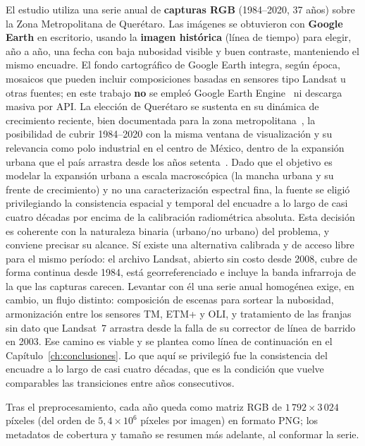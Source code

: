 El estudio utiliza una serie anual de \textbf{capturas RGB} (1984--2020, 37 años) sobre la Zona Metropolitana de Querétaro. Las imágenes se obtuvieron con \textbf{Google Earth} en escritorio, usando la \textbf{imagen histórica} (línea de tiempo) para elegir, año a año, una fecha con baja nubosidad visible y buen contraste, manteniendo el mismo encuadre. El fondo cartográfico de Google Earth integra, según época, mosaicos que pueden incluir composiciones basadas en sensores tipo Landsat u otras fuentes; en este trabajo \textbf{no} se empleó Google Earth Engine~\parencite{Gorelick2017} ni descarga masiva por API. La elección de Querétaro se sustenta en su dinámica de crecimiento reciente, bien documentada para la zona metropolitana~\parencite{Huacuz2018Metropolizacion}, la posibilidad de cubrir 1984--2020 con la misma ventana de visualización y su relevancia como polo industrial en el centro de México, dentro de la expansión urbana que el país arrastra desde los años setenta~\parencite{Montejano2023}. Dado que el objetivo es modelar la expansión urbana a escala macroscópica (la mancha urbana y su frente de crecimiento) y no una caracterización espectral fina, la fuente se eligió privilegiando la consistencia espacial y temporal del encuadre a lo largo de casi cuatro décadas por encima de la calibración radiométrica absoluta. Esta decisión es coherente con la naturaleza binaria (urbano/no urbano) del problema, y conviene precisar su alcance. Sí existe una alternativa calibrada y de acceso libre para el mismo período: el archivo Landsat, abierto sin costo desde 2008, cubre de forma continua desde 1984, está georreferenciado e incluye la banda infrarroja de la que las capturas carecen. Levantar con él una serie anual homogénea exige, en cambio, un flujo distinto: composición de escenas para sortear la nubosidad, armonización entre los sensores TM, ETM+ y OLI, y tratamiento de las franjas sin dato que Landsat~7 arrastra desde la falla de su corrector de línea de barrido en 2003. Ese camino es viable y se plantea como línea de continuación en el Capítulo~\ref{ch:conclusiones}. Lo que aquí se privilegió fue la consistencia del encuadre a lo largo de casi cuatro décadas, que es la condición que vuelve comparables las transiciones entre años consecutivos.

Tras el preprocesamiento, cada año queda como matriz RGB de \textbf{$1\,792 \times 3\,024$} píxeles (del orden de $5{,}4 \times 10^{6}$ píxeles por imagen) en formato PNG; los metadatos de cobertura y tamaño se resumen más adelante, al conformar la serie.

